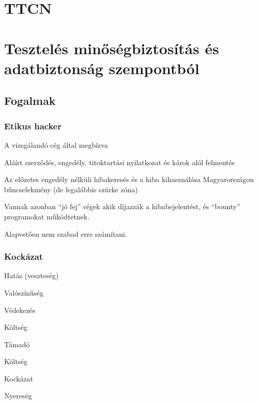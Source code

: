 \documentclass[a4paper,14pt, twocolumn]{extarticle}
\begin{document}
	\onecolumn
	
		
	\tableofcontents
	
	\twocolumn
	
	\leavevmode\thispagestyle{empty}\newpage
	\leavevmode\thispagestyle{empty}\newpage
	\section{TTCN}
	\section{Tesztelés minőségbiztosítás és adatbiztonság szempontból}
		\subsection{Fogalmak}
			\subsubsection{Etikus hacker}
				\begin{compactitem}
					\item A vizsgálandó cég által megbízva 
					\item Aláírt szerződés, engedély, titoktartási nyilatkozat és károk alól felmentés 
					\item Az előzetes engedély nélküli hibakeresés és a hiba kihasználása Magyarországon bűncselekmény (de legalábbis szürke zóna) 
					\item Vannak azonban “jó fej” cégek akik díjazzák a hibabejelentést, és “bounty” programokat működtetnek. 
					\item Alapvetően nem szabad erre számítani. 
				\end{compactitem}
			\subsubsection{Kockázat}
			\begin{compactitem}
				\item Hatás (veszteség)
				\item Valószínűség
				\item Védekezés
				{ 
					\begin{compactitem}
						\item Költség
					\end{compactitem}
				}
				\item Támadó
				{ 
					\begin{compactitem}
						\item Költség
						\item Kockázat
						\item Nyereség
					\end{compactitem}
				}
			\end{compactitem}
			\newpage
\end{document}
